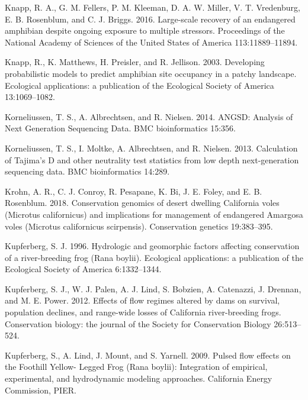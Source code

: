 \documentclass[proquest,12pt,final]{ucthesis-CA2012} %
\begin{document}
\begin{ucmainmatter}
\leavevmode\hypertarget{ref-knapp_large-scale_2016}{}%
Knapp, R. A., G. M. Fellers, P. M. Kleeman, D. A. W. Miller, V. T.
Vredenburg, E. B. Rosenblum, and C. J. Briggs. 2016. Large-scale
recovery of an endangered amphibian despite ongoing exposure to multiple
stressors. Proceedings of the National Academy of Sciences of the United
States of America 113:11889--11894.

\leavevmode\hypertarget{ref-knapp_developing_2003}{}%
Knapp, R., K. Matthews, H. Preisler, and R. Jellison. 2003. Developing
probabilistic models to predict amphibian site occupancy in a patchy
landscape. Ecological applications: a publication of the Ecological
Society of America 13:1069--1082.

\leavevmode\hypertarget{ref-korneliussen_angsd_2014}{}%
Korneliussen, T. S., A. Albrechtsen, and R. Nielsen. 2014. ANGSD:
Analysis of Next Generation Sequencing Data. BMC bioinformatics 15:356.

\leavevmode\hypertarget{ref-korneliussen_calculation_2013}{}%
Korneliussen, T. S., I. Moltke, A. Albrechtsen, and R. Nielsen. 2013.
Calculation of Tajima's D and other neutrality test statistics from low
depth next-generation sequencing data. BMC bioinformatics 14:289.

\leavevmode\hypertarget{ref-krohn_conservation_2018}{}%
Krohn, A. R., C. J. Conroy, R. Pesapane, K. Bi, J. E. Foley, and E. B.
Rosenblum. 2018. Conservation genomics of desert dwelling California
voles (Microtus californicus) and implications for management of
endangered Amargosa voles (Microtus californicus scirpensis).
Conservation genetics 19:383--395.

\leavevmode\hypertarget{ref-kupferberg_hydrologic_1996}{}%
Kupferberg, S. J. 1996. Hydrologic and geomorphic factors affecting
conservation of a river-breeding frog (Rana boylii). Ecological
applications: a publication of the Ecological Society of America
6:1332--1344.

\leavevmode\hypertarget{ref-kupferberg_effects_2012}{}%
Kupferberg, S. J., W. J. Palen, A. J. Lind, S. Bobzien, A. Catenazzi, J.
Drennan, and M. E. Power. 2012. Effects of flow regimes altered by dams
on survival, population declines, and range-wide losses of California
river-breeding frogs. Conservation biology: the journal of the Society
for Conservation Biology 26:513--524.

\leavevmode\hypertarget{ref-kupferberg_pulsed_2009}{}%
Kupferberg, S., A. Lind, J. Mount, and S. Yarnell. 2009. Pulsed flow
effects on the Foothill Yellow- Legged Frog (Rana boylii): Integration
of empirical, experimental, and hydrodynamic modeling approaches.
California Energy Commission, PIER.


\end{ucmainmatter}
\end{document}
